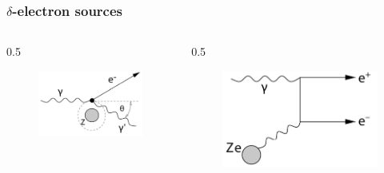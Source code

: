 \documentclass{beamer}
\begin{document}
\begin{frame}
    \frametitle{$\delta$-electron sources}
    \vspace{-4mm}
    \begin{columns}
        \begin{column}{0.5\framewidth}
            \begin{figure}[!h]
                \centering
                \includegraphics[width =0.8\columnwidth]{figures/png/Screenshot_20240812_204345.png}
               \end{figure}
        \end{column}
        \begin{column}{0.5\framewidth}
            \begin{figure}[!h]
                \centering
                \includegraphics[width =0.8\columnwidth]{figures/png/Screenshot_20240812_204755.png}
               \end{figure}
        \end{column}
    \end{columns}


\end{frame}
\end{document}
